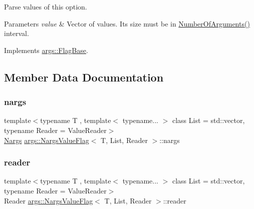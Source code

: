 Parse values of this option.


\begin{DoxyParams}{Parameters}
{\em value} & Vector of values. It\textquotesingle{}s size must be in \hyperlink{classargs_1_1_nargs_value_flag_a8db7ce6ec0d27f649dbfb1bba908078a}{Number\+Of\+Arguments()} interval. \\
\hline
\end{DoxyParams}


Implements \hyperlink{classargs_1_1_flag_base_a3421d9a595c9426dc73f62604cdee84f}{args\+::\+Flag\+Base}.



\subsection{Member Data Documentation}
\mbox{\label{classargs_1_1_nargs_value_flag_aaf60f389b1e4dc014792e4e515129db5}} 
\subsubsection{\texorpdfstring{nargs}{nargs}}
{\footnotesize\ttfamily template$<$typename T , template$<$ typename... $>$ class List = std\+::vector, typename Reader  = Value\+Reader$>$ \\
\hyperlink{structargs_1_1_nargs}{Nargs} \hyperlink{classargs_1_1_nargs_value_flag}{args\+::\+Nargs\+Value\+Flag}$<$ T, List, Reader $>$\+::nargs\hspace{0.3cm}{\ttfamily [protected]}}

\mbox{\label{classargs_1_1_nargs_value_flag_a8308b02f086b773b21e588c0e36b6656}} 
\subsubsection{\texorpdfstring{reader}{reader}}
{\footnotesize\ttfamily template$<$typename T , template$<$ typename... $>$ class List = std\+::vector, typename Reader  = Value\+Reader$>$ \\
Reader \hyperlink{classargs_1_1_nargs_value_flag}{args\+::\+Nargs\+Value\+Flag}$<$ T, List, Reader $>$\+::reader\hspace{0.3cm}{\ttfamily [protected]}}


